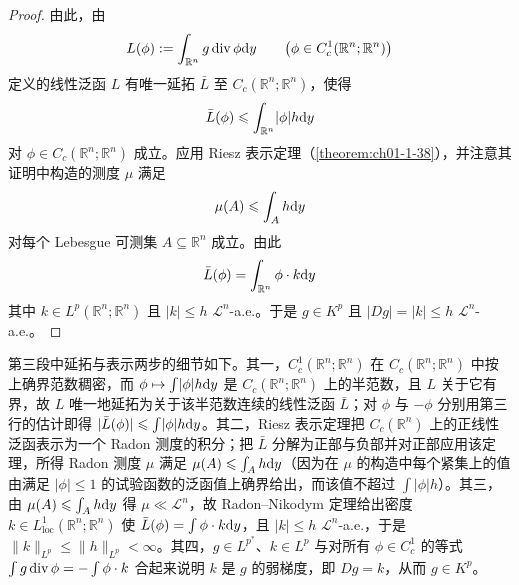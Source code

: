 \documentclass[../../main.tex]{subfiles}%
\begin{document}
\begin{proof}
由此，由
\begin{align*}
L(\phi):=\int_{\mathbb{R}^n}g\operatorname{div}\phi\mathrm{d} y\qquad\bigl(\phi\in C_c^1(\mathbb{R}^n;\mathbb{R}^n)\bigr)
\end{align*}
定义的线性泛函 $L$ 有唯一延拓 $\bar L$ 至 $C_c(\mathbb{R}^n;\mathbb{R}^n)$，使得
\begin{align*}
\bar L(\phi)\leqslant\int_{\mathbb{R}^n}\lvert\phi\rvert h\mathrm{d} y
\end{align*}
对 $\phi\in C_c(\mathbb{R}^n;\mathbb{R}^n)$ 成立。应用 Riesz 表示定理（\cref{theorem:ch01-1-38}），并注意其证明中构造的测度 $\mu$ 满足%
\begin{align*}
\mu(A)\leqslant\int_A h\mathrm{d} y
\end{align*}
对每个 Lebesgue 可测集 $A\subseteq\mathbb{R}^n$ 成立。由此
\begin{align*}
\bar L(\phi)=\int_{\mathbb{R}^n}\phi\cdot k\mathrm{d} y
\end{align*}
其中 $k\in L^p(\mathbb{R}^n;\mathbb{R}^n)$ 且 $\lvert k\rvert\leqslant h$ $\mathcal{L}^n$-a.e.。于是 $g\in K^p$ 且 $\lvert Dg\rvert=\lvert k\rvert\leqslant h$ $\mathcal{L}^n$-a.e.。
\end{proof}

\begin{remark}\label{remark:ch04-thm-4-13-延拓}
第三段中延拓与表示两步的细节如下。其一，$C_c^1(\mathbb{R}^n;\mathbb{R}^n)$ 在 $C_c(\mathbb{R}^n;\mathbb{R}^n)$ 中按上确界范数稠密，而 $\phi\mapsto\int\lvert\phi\rvert h\mathrm{d} y$ 是 $C_c(\mathbb{R}^n;\mathbb{R}^n)$ 上的半范数，且 $L$ 关于它有界，故 $L$ 唯一地延拓为关于该半范数连续的线性泛函 $\bar L$；对 $\phi$ 与 $-\phi$ 分别用第三行的估计即得 $\lvert\bar L(\phi)\rvert\leqslant\int\lvert\phi\rvert h\mathrm{d} y$。其二，Riesz 表示定理把 $C_c(\mathbb{R}^n)$ 上的正线性泛函表示为一个 Radon 测度的积分；把 $\bar L$ 分解为正部与负部并对正部应用该定理，所得 Radon 测度 $\mu$ 满足 $\mu(A)\leqslant\int_A h\mathrm{d} y$（因为在 $\mu$ 的构造中每个紧集上的值由满足 $\lvert\phi\rvert\leqslant1$ 的试验函数的泛函值上确界给出，而该值不超过 $\int\lvert\phi\rvert h$）。其三，由 $\mu(A)\leqslant\int_A h\mathrm{d} y$ 得 $\mu\ll\mathcal{L}^n$，故 Radon--Nikodym 定理给出密度 $k\in L^1_{\mathrm{loc}}(\mathbb{R}^n;\mathbb{R}^n)$ 使 $\bar L(\phi)=\int\phi\cdot k\mathrm{d} y$，且 $\lvert k\rvert\leqslant h$ $\mathcal{L}^n$-a.e.，于是 $\lVert k\rVert_{L^p}\leqslant\lVert h\rVert_{L^p}<\infty$。其四，$g\in L^{p^*}$、$k\in L^p$ 与对所有 $\phi\in C_c^1$ 的等式 $\int g\operatorname{div}\phi=-\int\phi\cdot k$ 合起来说明 $k$ 是 $g$ 的弱梯度，即 $Dg=k$，从而 $g\in K^p$。
\end{remark}
\end{document}
